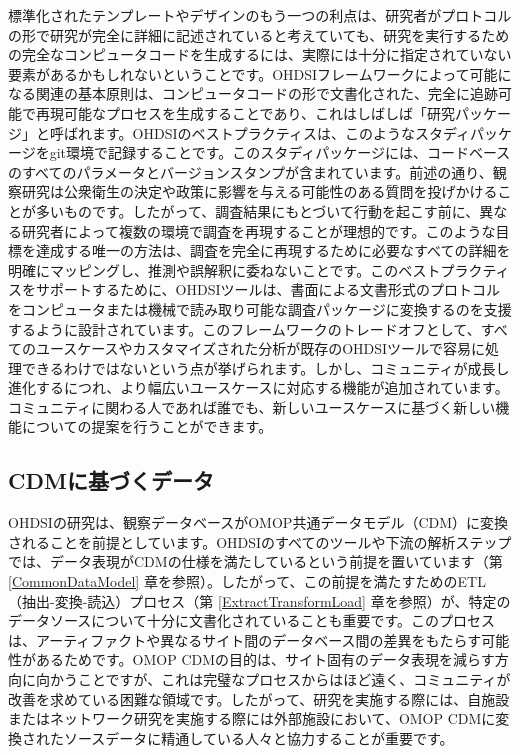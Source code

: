 \documentclass[
  11pt]{book}
\theoremstyle{definition}
\theoremstyle{definition}
\theoremstyle{definition}
\theoremstyle{definition}
\theoremstyle{remark}
\begin{document}
標準化されたテンプレートやデザインのもう一つの利点は、研究者がプロトコルの形で研究が完全に詳細に記述されていると考えていても、研究を実行するための完全なコンピュータコードを生成するには、実際には十分に指定されていない要素があるかもしれないということです。OHDSIフレームワークによって可能になる関連の基本原則は、コンピュータコードの形で文書化された、完全に追跡可能で再現可能なプロセスを生成することであり、これはしばしば「研究パッケージ」と呼ばれます。OHDSIのベストプラクティスは、このようなスタディパッケージをgit環境で記録することです。このスタディパッケージには、コードベースのすべてのパラメータとバージョンスタンプが含まれています。前述の通り、観察研究は公衆衛生の決定や政策に影響を与える可能性のある質問を投げかけることが多いものです。したがって、調査結果にもとづいて行動を起こす前に、異なる研究者によって複数の環境で調査を再現することが理想的です。このような目標を達成する唯一の方法は、調査を完全に再現するために必要なすべての詳細を明確にマッピングし、推測や誤解釈に委ねないことです。このベストプラクティスをサポートするために、OHDSIツールは、書面による文書形式のプロトコルをコンピュータまたは機械で読み取り可能な調査パッケージに変換するのを支援するように設計されています。このフレームワークのトレードオフとして、すべてのユースケースやカスタマイズされた分析が既存のOHDSIツールで容易に処理できるわけではないという点が挙げられます。しかし、コミュニティが成長し進化するにつれ、より幅広いユースケースに対応する機能が追加されています。コミュニティに関わる人であれば誰でも、新しいユースケースに基づく新しい機能についての提案を行うことができます。

\subsection{CDMに基づくデータ}\label{cdmux306bux57faux3065ux304fux30c7ux30fcux30bf}

OHDSIの研究は、観察データベースがOMOP共通データモデル（CDM）に変換されることを前提としています。OHDSIのすべてのツールや下流の解析ステップでは、データ表現がCDMの仕様を満たしているという前提を置いています（第 \ref{CommonDataModel} 章を参照）。したがって、この前提を満たすためのETL（抽出-変換-読込）プロセス（第 \ref{ExtractTransformLoad} 章を参照）が、特定のデータソースについて十分に文書化されていることも重要です。このプロセスは、アーティファクトや異なるサイト間のデータベース間の差異をもたらす可能性があるためです。OMOP CDMの目的は、サイト固有のデータ表現を減らす方向に向かうことですが、これは完璧なプロセスからはほど遠く、コミュニティが改善を求めている困難な領域です。したがって、研究を実施する際には、自施設またはネットワーク研究を実施する際には外部施設において、OMOP CDMに変換されたソースデータに精通している人々と協力することが重要です。
\end{document}
